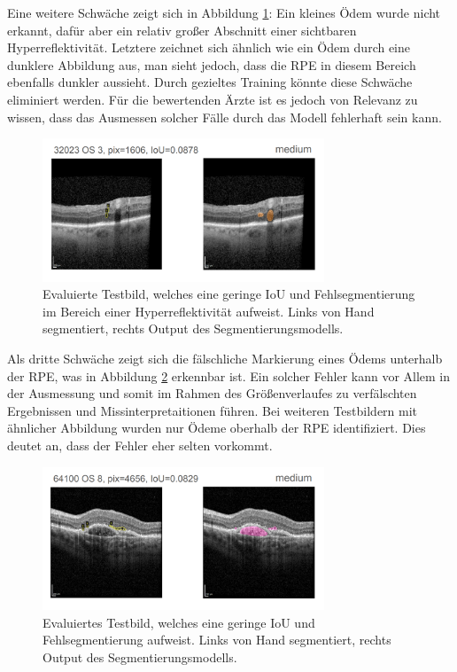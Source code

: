 Eine weitere Schwäche zeigt sich in Abbildung \ref{fig:ergebnis_notgood2}: Ein kleines Ödem wurde nicht erkannt, dafür aber ein relativ großer Abschnitt einer sichtbaren Hyperreflektivität. Letztere zeichnet sich ähnlich wie ein Ödem durch eine dunklere Abbildung aus, man sieht jedoch, dass die RPE in diesem Bereich ebenfalls dunkler aussieht. Durch gezieltes Training könnte diese Schwäche eliminiert werden. Für die bewertenden Ärzte ist es jedoch von Relevanz zu wissen, dass das Ausmessen solcher Fälle durch das Modell fehlerhaft sein kann.\newline
\begin{figure}[H]
\centering
\includegraphics[width=0.75\textwidth]{./pic/Segmentierung/Segmentierungsergebnisse/2.PNG}
\caption{\label{fig:ergebnis_notgood2}Evaluierte Testbild, welches eine geringe IoU und Fehlsegmentierung im Bereich einer Hyperreflektivität aufweist. Links von Hand segmentiert, rechts Output des Segmentierungsmodells.}
\end{figure}

Als dritte Schwäche zeigt sich die fälschliche Markierung eines Ödems unterhalb der RPE, was in Abbildung \ref{fig:ergebnis_notgood3} erkennbar ist. Ein solcher Fehler kann vor Allem in der Ausmessung und somit im Rahmen des Größenverlaufes zu verfälschten Ergebnissen und Missinterpretaitionen führen. Bei weiteren Testbildern mit ähnlicher Abbildung wurden nur Ödeme oberhalb der RPE identifiziert. Dies deutet an, dass der Fehler eher selten vorkommt.\newline
\begin{figure}[H]
\centering
\includegraphics[width=0.75\textwidth]{./pic/Segmentierung/Segmentierungsergebnisse/3.PNG}
\caption{\label{fig:ergebnis_notgood3}Evaluiertes Testbild, welches eine geringe IoU und Fehlsegmentierung aufweist. Links von Hand segmentiert, rechts Output des Segmentierungsmodells.}
\end{figure}

